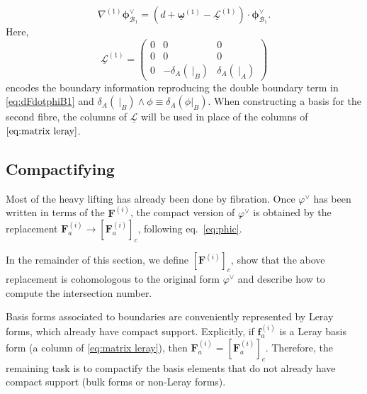 \documentclass[11pt]{article}
\newcommand{\be}{\begin{equation}}
\newcommand{\ee}{\end{equation}}
\renewcommand{\L}{\mathcal{L}}
\newcommand{\B}{\mathcal{B}}
\newcommand{\vphi}{\varphi}
\newcommand{\bs}[1]{\boldsymbol{#1}}
\newcommand{\mat}[1]{\underline{\boldsymbol{#1}}}
\begin{document}
\be
	\nabla^{(1)} \bs{\phi}^\vee_{\B_1} 
	= (d  + \mat{\omega}^{(1)} - \mat{\L}^{(1)}) \cdot \bs{\phi}^\vee_{\B_1}.
\ee
Here, 
\be \label{eq:leray matrix}
	\mat{\L}^{(1)} 
	= \begin{pmatrix} 
		0 & 0 & 0
		\\ 
		0 & 0 & 0
		\\
		0 & -\delta_A(\ \vert_B) & \delta_A(\ \vert_A)
	\end{pmatrix}
\ee
encodes the boundary information reproducing the double boundary term in \eqref{eq:dFdotphiB1} and $\delta_A(\ \vert_B) \wedge \phi \equiv \delta_A(\phi \vert_B)$. 
When constructing a basis for the second fibre, the columns of $\mat{\L}$ will be used in place of the columns of $\eqref{eq:matrix leray}$.

\subsection{Compactifying \label{sec:compactifying-gen}}

Most of the heavy lifting has already been done by fibration. Once $\vphi^\vee$ has been written in terms of the $\bs{F}^{(i)}$, the compact version of $\vphi^\vee$ is obtained by the replacement $\bs{F}^{(i)}_a \to [\bs{F}^{(i)}_a]_c$, following
eq.~\eqref{eq:phic}.

In the remainder of this section, we define $[\bs{F}^{(i)}]_c$, show that the above replacement is cohomologous to the original form $\vphi^\vee$ and describe how to compute the intersection number. 

Basis forms associated to boundaries are conveniently represented by Leray forms, which already have compact support. 
Explicitly, if $\bs{f}^{(i)}_a$ is a Leray basis form (a column of \eqref{eq:matrix leray}), then $\bs{F}^{(i)}_a = [\bs{F}^{(i)}_a]_c$.
Therefore, the remaining task is to compactify the basis elements that do not already have compact support (bulk forms or non-Leray forms).   
\end{document}
